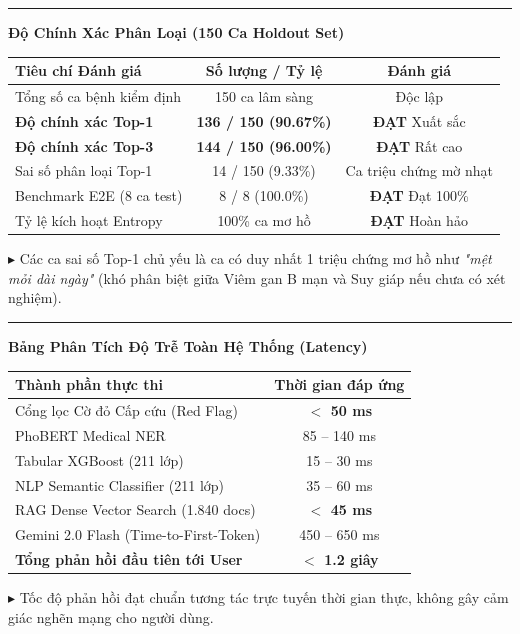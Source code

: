 \documentclass[10pt]{article}
\newcommand{\Lone}[1]{%
  \vspace{0.07cm}%
  {\color{samblue}\rule[-0.12ex]{2.5pt}{0.92em}}\hspace{0.16cm}%
  {\fontsize{8.2}{10.2}\selectfont\bfseries\sffamily\color{textdark}#1}\par
  \vspace{0.02cm}%
}
\newcommand{\Ltwo}[1]{%
  \hspace*{0.35cm}%
  {\color{samblue}\fontsize{5.2}{5.2}\selectfont$\blacktriangleright$}\hspace{0.12cm}%
  {\fontsize{7.2}{8.8}\selectfont\sffamily\color{textdark}#1}\par
  \vspace{0.02cm}%
}
\newcommand{\Good}{\textcolor{goodgreen}{\bfseries\sffamily ĐẠT}}
\begin{document}
\begin{minipage}[t]{0.50\textwidth}
\Lone{Độ Chính Xác Phân Loại (150 Ca Holdout Set)}
{\fontsize{7}{8.5}\selectfont\sffamily
\begin{tabular}{|l|c|c|}
\hline
\textbf{Tiêu chí Đánh giá} & \textbf{Số lượng / Tỷ lệ} & \textbf{Đánh giá} \\ \hline
Tổng số ca bệnh kiểm định & 150 ca lâm sàng & Độc lập \\ \hline
\textbf{Độ chính xác Top-1} & \textbf{136 / 150 (90.67\%)} & \Good{} Xuất sắc \\ \hline
\textbf{Độ chính xác Top-3} & \textbf{144 / 150 (96.00\%)} & \Good{} Rất cao \\ \hline
Sai số phân loại Top-1 & 14 / 150 (9.33\%) & Ca triệu chứng mờ nhạt \\ \hline
Benchmark E2E (8 ca test) & 8 / 8 (100.0\%) & \Good{} Đạt 100\% \\ \hline
Tỷ lệ kích hoạt Entropy & 100\% ca mơ hồ & \Good{} Hoàn hảo \\ \hline
\end{tabular}
}
\vspace{0.08cm}
\Ltwo{Các ca sai số Top-1 chủ yếu là ca có duy nhất 1 triệu chứng mơ hồ như \textit{"mệt mỏi dài ngày"} (khó phân biệt giữa Viêm gan B mạn và Suy giáp nếu chưa có xét nghiệm).}
\end{minipage}%
\hfill%
\begin{minipage}[t]{0.47\textwidth}
\Lone{Bảng Phân Tích Độ Trễ Toàn Hệ Thống (Latency)}
{\fontsize{7}{8.5}\selectfont\sffamily
\begin{tabular}{|l|c|}
\hline
\textbf{Thành phần thực thi} & \textbf{Thời gian đáp ứng} \\ \hline
Cổng lọc Cờ đỏ Cấp cứu (Red Flag) & \textbf{$<$ 50 ms} \\ \hline
PhoBERT Medical NER & 85 -- 140 ms \\ \hline
Tabular XGBoost (211 lớp) & 15 -- 30 ms \\ \hline
NLP Semantic Classifier (211 lớp) & 35 -- 60 ms \\ \hline
RAG Dense Vector Search (1.840 docs) & \textbf{$<$ 45 ms} \\ \hline
Gemini 2.0 Flash (Time-to-First-Token) & 450 -- 650 ms \\ \hline
\textbf{Tổng phản hồi đầu tiên tới User} & \textbf{$<$ 1.2 giây} \\ \hline
\end{tabular}
}
\vspace{0.08cm}
\Ltwo{Tốc độ phản hồi đạt chuẩn tương tác trực tuyến thời gian thực, không gây cảm giác nghẽn mạng cho người dùng.}
\end{minipage}
\end{document}

